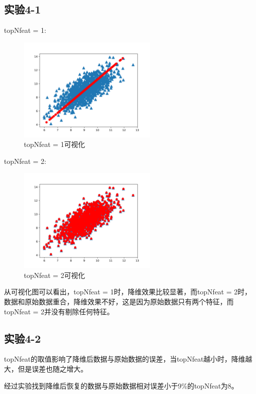 \documentclass{../source/Experiment}
\begin{document}
        \subsection{实验4-1}
            topNfeat = 1:
            \begin{figure}[H]
                \centering
                \includegraphics[width = 0.6\textwidth]{Part4/4-1-topNfeat(1).png}
                \caption{topNfeat = 1可视化}
            \end{figure}

            topNfeat = 2:
            \begin{figure}[H]
                \centering
                \includegraphics[width = 0.6\textwidth]{Part4/4-1-topNfeat(2).png}
                \caption{topNfeat = 2可视化}
            \end{figure}

            从可视化图可以看出，topNfeat = 1时，降维效果比较显著，而topNfeat = 2时，数据和原始数据重合，降维效果不好，这是因为原始数据只有两个特征，而topNfeat = 2并没有剔除任何特征。
            
    \subsection{实验4-2}
        topNfeat的取值影响了降维后数据与原始数据的误差，当topNfeat越小时，降维越大，但是误差也随之增大。

        经过实验找到降维后恢复的数据与原始数据相对误差小于9\%的topNfeat为8。
\end{document}
